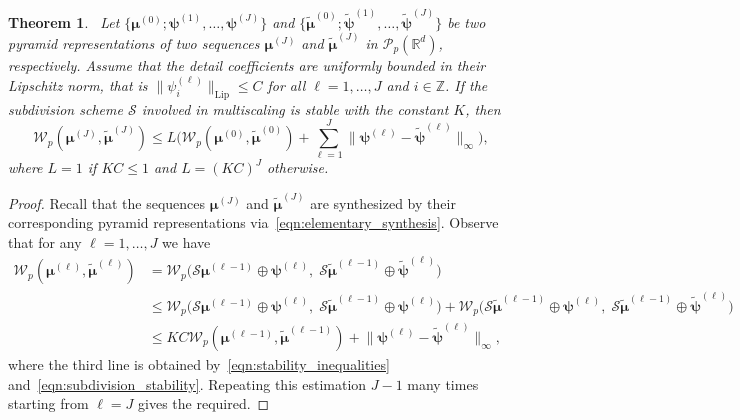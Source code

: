 \documentclass[12pt]{amsart}
\newtheorem{theorem}{Theorem}[section]
\begin{document}
\begin{theorem}~\label{thm:stability}
    Let $\{\boldsymbol{\mu}^{(0)}; \boldsymbol{\psi}^{(1)},\dots,\boldsymbol{\psi}^{(J)}\}$ and $\{\widetilde{\boldsymbol{\mu}}^{(0)}; \widetilde{\boldsymbol{\psi}}^{(1)},\dots,\widetilde{\boldsymbol{\psi}}^{(J)}\}$ be two pyramid representations of two sequences $\boldsymbol{\mu}^{(J)}$ and $\widetilde{\boldsymbol{\mu}}^{(J)}$ in $\mathcal{P}_p(\mathbb{R}^d)$, respectively. Assume that the detail coefficients are uniformly bounded in their Lipschitz norm, that is $\|\psi^{(\ell)}_i\|_{\text{Lip}}\leq C$ for all $\ell=1, \dots, J$ and $i\in\mathbb{Z}$. If the subdivision scheme $\mathcal{S}$ involved in multiscaling is stable with the constant $K$, then
    \begin{equation}~\label{eqn:stability}
        \mathcal{W}_p(\boldsymbol{\mu}^{(J)}, \widetilde{\boldsymbol{\mu}}^{(J)}) \leq L\bigg(\mathcal{W}_p(\boldsymbol{\mu}^{(0)}, \widetilde{\boldsymbol{\mu}}^{(0)})+\sum_{\ell=1}^J\|\boldsymbol{\psi}^{(\ell)}-\widetilde{\boldsymbol{\psi}}^{(\ell)}\|_\infty\bigg),
    \end{equation}
    where $L=1$ if $KC\leq1$ and $L=(KC)^J$ otherwise.
\end{theorem}

\begin{proof}
    Recall that the sequences $\boldsymbol{\mu}^{(J)}$ and $\widetilde{\boldsymbol{\mu}}^{(J)}$ are synthesized by their corresponding pyramid representations via~\eqref{eqn:elementary_synthesis}. Observe that for any $\ell=1,\dots,J$ we have
    \begin{align*}
        \mathcal{W}_p(\boldsymbol{\mu}^{(\ell)}, \widetilde{\boldsymbol{\mu}}^{(\ell)}) & = \mathcal{W}_p\big(\mathcal{S}\boldsymbol{\mu}^{(\ell-1)}\oplus\boldsymbol{\psi}^{(\ell)},\; \mathcal{S}\widetilde{\boldsymbol{\mu}}^{(\ell-1)}\oplus\widetilde{\boldsymbol{\psi}}^{(\ell)}\big) \\
        & \leq \mathcal{W}_p\big(\mathcal{S}\boldsymbol{\mu}^{(\ell-1)}\oplus\boldsymbol{\psi}^{(\ell)},\; \mathcal{S}\widetilde{\boldsymbol{\mu}}^{(\ell-1)}\oplus\boldsymbol{\psi}^{(\ell)}\big) + \mathcal{W}_p\big(\mathcal{S}\widetilde{\boldsymbol{\mu}}^{(\ell-1)}\oplus\boldsymbol{\psi}^{(\ell)},\; \mathcal{S}\widetilde{\boldsymbol{\mu}}^{(\ell-1)}\oplus\widetilde{\boldsymbol{\psi}}^{(\ell)}\big) \\
        & \leq KC \mathcal{W}_p(\boldsymbol{\mu}^{(\ell-1)},\widetilde{\boldsymbol{\mu}}^{(\ell-1)}) + \big\|\boldsymbol{\psi}^{(\ell)} -\widetilde{\boldsymbol{\psi}}^{(\ell)}\big\|_\infty,
    \end{align*}
    where the third line is obtained by~\eqref{eqn:stability_inequalities} and~\eqref{eqn:subdivision_stability}. Repeating this estimation $J-1$ many times starting from $\ell=J$ gives the required.
\end{proof}
\end{document}
